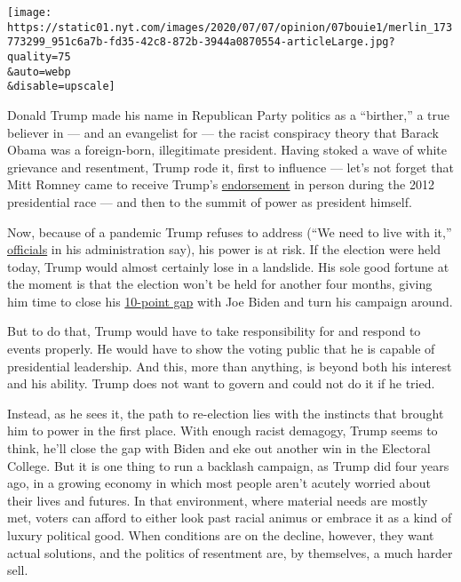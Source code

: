 \texttt{[image: https://static01.nyt.com/images/2020/07/07/opinion/07bouie1/merlin\_173773299\_951c6a7b-fd35-42c8-872b-3944a0870554-articleLarge.jpg?quality=75\\\&auto=webp\\\&disable=upscale]}

Donald Trump made his name in Republican Party politics as a
``birther,'' a true believer in --- and an evangelist for --- the racist
conspiracy theory that Barack Obama was a foreign-born, illegitimate
president. Having stoked a wave of white grievance and resentment, Trump
rode it, first to influence --- let's not forget that Mitt Romney came
to receive Trump's \href{https://youtu.be/nmwzGMmGcJw}{endorsement} in
person during the 2012 presidential race --- and then to the summit of
power as president himself.

Now, because of a pandemic Trump refuses to address (``We need to live
with it,''
\href{https://www.nbcnews.com/politics/politics-news/we-need-live-it-white-house-readies-new-message-nation-n1232884}{officials}
in his administration say), his power is at risk. If the election were
held today, Trump would almost certainly lose in a landslide. His sole
good fortune at the moment is that the election won't be held for
another four months, giving him time to close his
\href{https://projects.fivethirtyeight.com/polls/}{10-point gap} with
Joe Biden and turn his campaign around.

But to do that, Trump would have to take responsibility for and respond
to events properly. He would have to show the voting public that he is
capable of presidential leadership. And this, more than anything, is
beyond both his interest and his ability. Trump does not want to govern
and could not do it if he tried.

Instead, as he sees it, the path to re-election lies with the instincts
that brought him to power in the first place. With enough racist
demagogy, Trump seems to think, he'll close the gap with Biden and eke
out another win in the Electoral College. But it is one thing to run a
backlash campaign, as Trump did four years ago, in a growing economy in
which most people aren't acutely worried about their lives and futures.
In that environment, where material needs are mostly met, voters can
afford to either look past racial animus or embrace it as a kind of
luxury political good. When conditions are on the decline, however, they
want actual solutions, and the politics of resentment are, by
themselves, a much harder sell.

